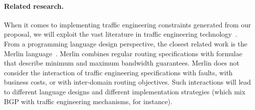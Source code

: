 




\paragraph*{Related research.}
When it comes to implementing traffic engineering constraints generated from
our proposal, we will exploit
the vast literature in traffic engineering technology~\cite{?,?}.  From a programming language
design perspective, the closest related work is the Merlin language~\cite{foster:merlin}.  Merlin
combines regular routing specifications with formulae that describe minimum and maximum
bandwidth guarantees.  Merlin does not consider the interaction of traffic engineering
specifications with faults, with business costs, or with inter-domain routing objectives.  
Such interactions will lead to different language designs and different implementation
strategies (which mix BGP with traffic engineering mechanisms, for instance).

